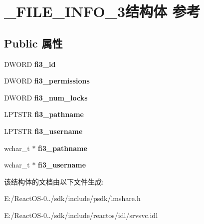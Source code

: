 \hypertarget{struct___f_i_l_e___i_n_f_o__3}{}\section{\+\_\+\+F\+I\+L\+E\+\_\+\+I\+N\+F\+O\+\_\+3结构体 参考}
\label{struct___f_i_l_e___i_n_f_o__3}
\subsection*{Public 属性}
\begin{DoxyCompactItemize}
\item 
\mbox{\label{struct___f_i_l_e___i_n_f_o__3_a09674ccb2a7b450e3925cca956932ebd}} 
D\+W\+O\+RD {\bfseries fi3\+\_\+id}
\item 
\mbox{\label{struct___f_i_l_e___i_n_f_o__3_aac055abe5031f00921bec5d020f17cf2}} 
D\+W\+O\+RD {\bfseries fi3\+\_\+permissions}
\item 
\mbox{\label{struct___f_i_l_e___i_n_f_o__3_a1ea7e8e7439491a8a87520c16971621e}} 
D\+W\+O\+RD {\bfseries fi3\+\_\+num\+\_\+locks}
\item 
\mbox{\label{struct___f_i_l_e___i_n_f_o__3_af1d146763c9dc80745992ec3cc252715}} 
L\+P\+T\+S\+TR {\bfseries fi3\+\_\+pathname}
\item 
\mbox{\label{struct___f_i_l_e___i_n_f_o__3_a6dcfa43e316b71c8dccaf4bf9df1c245}} 
L\+P\+T\+S\+TR {\bfseries fi3\+\_\+username}
\item 
\mbox{\label{struct___f_i_l_e___i_n_f_o__3_a9620dc79d748133324c6ed27817be7c2}} 
wchar\+\_\+t $\ast$ {\bfseries fi3\+\_\+pathname}
\item 
\mbox{\label{struct___f_i_l_e___i_n_f_o__3_ae22f2ed5b6d7b6eca5c3e5e0a17ae0f3}} 
wchar\+\_\+t $\ast$ {\bfseries fi3\+\_\+username}
\end{DoxyCompactItemize}


该结构体的文档由以下文件生成\+:\begin{DoxyCompactItemize}
\item 
E\+:/\+React\+O\+S-\/0../sdk/include/psdk/lmshare.\+h\item 
E\+:/\+React\+O\+S-\/0../sdk/include/reactos/idl/srvsvc.\+idl\end{DoxyCompactItemize}
